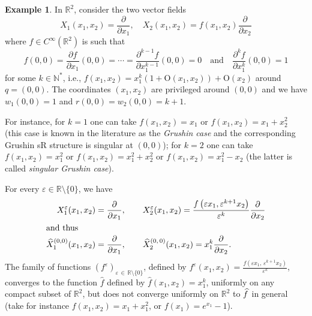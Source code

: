 \documentclass[10pt]{amsart}
\theoremstyle{definition}\newtheorem{defi}[theo]{Definition}\newtheorem{rema}[theo]{Remark}\newtheorem{exam}[theo]{Example}\newtheorem{exem}[theo]{Example}\newtheorem{nota}[theo]{Notation}
\newcommand*\R{\mathbb{R}}
\newcommand*\N{\mathbb{N}}
\newcommand{\rmO}{\mathrm{O}}
\let\oldhat\hat
\renewcommand*{\hat}[1]{\mathchoice{\widehat{#1}}{\widehat{#1}}{\oldhat{#1}}{\oldhat{#1}}}
\begin{document}
\begin{exem}\label{example_lemmaYi}
In $\R^2$, consider the two vector fields
\[
X_1(x_1,x_2) = \frac{\partial}{\partial x_1},\quad X_2(x_1,x_2) = f(x_1,x_2)\frac{\partial}{\partial x_2}
\]
where $f\in C^\infty(\R^2)$ is such that
\[
f(0,0)=\frac{\partial f}{\partial x_1}(0,0)=\cdots=\frac{\partial^{k-1}f}{\partial x_1^{k-1}}(0,0)=0\quad\text{and}\quad\frac{\partial^k f}{\partial x_1^k}(0,0)=1
\]
for some $k\in\N^*$, i.e., $f(x_1,x_2)=x_1^k(1+\rmO(x_1,x_2))+\rmO(x_2)$ around $q=(0,0)$. The coordinates $(x_1,x_2)$ are privileged around $(0,0)$ and we have $w_1(0,0)=1$ and $r(0,0)=w_2(0,0)=k+1$.

For instance, for $k=1$ one can take $f(x_1,x_2)=x_1$ or $f(x_1,x_2)=x_1+x_2^2$ (this case is known in the literature as the \emph{Grushin case} and the corresponding Grushin sR structure is singular at $(0,0)$); for $k=2$ one can take $f(x_1,x_2)=x_1^2$ or $f(x_1,x_2)=x_1^2+x_2^2$ or $f(x_1,x_2)=x_1^2-x_2$ (the latter is called \emph{singular Grushin case}).

For every $\varepsilon\in\R\setminus\{0\}$, we have
\begin{align*}
X_1^\varepsilon(x_1,x_2) &= \frac{\partial}{\partial x_1},\qquad X_2^\varepsilon(x_1,x_2) = \frac{f\left(\varepsilon x_1,\varepsilon^{k+1} x_2\right)}{\varepsilon^k}\frac{\partial}{\partial x_2}
\\
\intertext{and thus}
\widehat{X}^{(0,0)}_1(x_1,x_2) &= \frac{\partial}{\partial x_1},\qquad \widehat{X}^{(0,\,0)}_2(x_1,x_2) = x_1^k\frac{\partial}{\partial x_2}.
\end{align*}
The family of functions $(f^\varepsilon)_{\varepsilon\,\in\,\R\setminus\{0\}}$, defined by $f^\varepsilon(x_1,x_2)=\tfrac{f(\varepsilon x_1,\,\varepsilon^{k+1} x_2)}{\varepsilon^k}$, converges to the function $\widehat f$ defined by $\widehat f(x_1,x_2)=x_1^k$, uniformly on any compact subset of $\R^2$, but does not converge uniformly on $\R^2$ to $\hat f$ in general (take for instance $f(x_1,x_2)=x_1+x_1^2$, or $f(x_1)=e^{x_1}-1$).


\end{exem}
\end{document}
